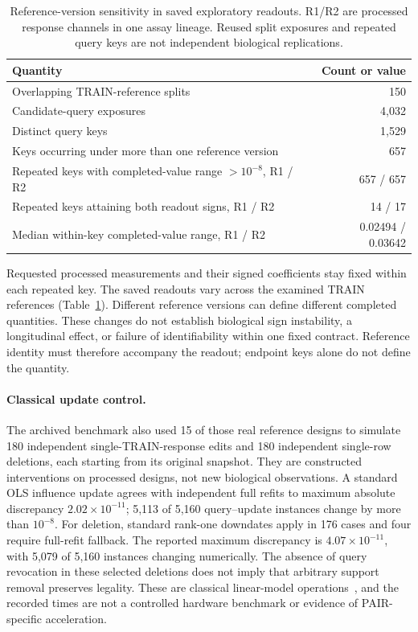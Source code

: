 \documentclass[11pt]{article}
\begin{document}
\begin{table}[htbp]
\centering\small
\caption{Reference-version sensitivity in saved exploratory readouts. R1/R2 are processed response channels in one assay lineage. Reused split exposures and repeated query keys are not independent biological replications.}
\label{tab:referenceversion}
\begin{tabularx}{\textwidth}{@{}Xr@{}}
\toprule
Quantity & Count or value\\\midrule
Overlapping TRAIN-reference splits & 150\\
Candidate-query exposures & 4,032\\
Distinct query keys & 1,529\\
Keys occurring under more than one reference version & 657\\
Repeated keys with completed-value range $>10^{-8}$, R1 / R2 & 657 / 657\\
Repeated keys attaining both readout signs, R1 / R2 & 14 / 17\\
Median within-key completed-value range, R1 / R2 & 0.02494 / 0.03642\\\bottomrule
\end{tabularx}
\end{table}

Requested processed measurements and their signed coefficients stay fixed within each repeated key. The saved readouts vary across the examined TRAIN references (Table~\ref{tab:referenceversion}). Different reference versions can define different completed quantities. These changes do not establish biological sign instability, a longitudinal effect, or failure of identifiability within one fixed contract. Reference identity must therefore accompany the readout; endpoint keys alone do not define the quantity.

\paragraph{Classical update control.}
The archived benchmark also used 15 of those real reference designs to simulate 180 independent single-TRAIN-response edits and 180 independent single-row deletions, each starting from its original snapshot. They are constructed interventions on processed designs, not new biological observations. A standard OLS influence update agrees with independent full refits to maximum absolute discrepancy $2.02\times10^{-11}$; 5,113 of 5,160 query--update instances change by more than $10^{-8}$. For deletion, standard rank-one downdates apply in 176 cases and four require full-refit fallback. The reported maximum discrepancy is $4.07\times10^{-11}$, with 5,079 of 5,160 instances changing numerically. The absence of query revocation in these selected deletions does not imply that arbitrary support removal preserves legality. These are classical linear-model operations~\cite{rao1971generalized}, and the recorded times are not a controlled hardware benchmark or evidence of PAIR-specific acceleration.
\end{document}
